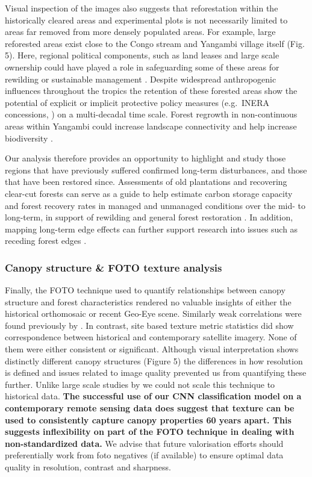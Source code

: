 \documentclass[remote sensing,article,submit,moreauthors,pdftex]{mdpi}
\begin{document}
Visual inspection of the images also suggests that reforestation within
the historically cleared areas and experimental plots is not necessarily
limited to areas far removed from more densely populated areas. For
example, large reforested areas exist close to the Congo stream and
Yangambi village itself (Fig. 5). Here, regional political components,
such as land leases and large scale ownership could have played a role
in safeguarding some of these areas for rewilding or sustainable
management \citep{arima2014, larson2011}. Despite widespread
anthropogenic influences throughout the tropics \citep{lewis2015} the
retention of these forested areas show the potential of explicit or
implicit protective policy measures (e.g.~INERA concessions,
\citet{bustillo2018}) on a multi-decadal time scale. Forest regrowth in
non-continuous areas within Yangambi could increase landscape
connectivity and help increase biodiversity \citep{vandeperre2018}.

Our analysis therefore provides an opportunity to highlight and study
those regions that have previously suffered confirmed long-term
disturbances, and those that have been restored since. Assessments of
old plantations and recovering clear-cut forests can serve as a guide to
help estimate carbon storage capacity and forest recovery rates in
managed and unmanaged conditions
\citep{gourlet-fleury2013, sader1988, achard2014} over the mid- to
long-term, in support of rewilding and general forest restoration
\citep{arima2014, larson2011, vandeperre2018}. In addition, mapping
long-term edge effects can further support research into issues such as
receding forest edges \citep{gascon2000}.

\hypertarget{canopy-structure-foto-texture-analysis-2}{%
\subsubsection{Canopy structure \& FOTO texture
analysis}\label{canopy-structure-foto-texture-analysis-2}}

Finally, the FOTO technique used to quantify relationships between
canopy structure and forest characteristics rendered no valuable
insights of either the historical orthomosaic or recent Geo-Eye scene.
Similarly weak correlations were found previously by
\citet{solorzano2018}. In contrast, site based texture metric statistics
did show correspondence between historical and contemporary satellite
imagery. None of them were either consistent or significant. Although
visual interpretation shows distinctly different canopy structures
(Figure 5) the differences in how resolution is defined and issues
related to image quality prevented us from quantifying these further.
Unlike large scale studies by \citet{Ploton2012} we could not scale this
technique to historical data. \textbf{The successful use of our CNN
classification model on a contemporary remote sensing data does suggest
that texture can be used to consistently capture canopy properties 60
years apart. This suggests inflexibility on part of the FOTO technique
in dealing with non-standardized data.} We advise that future
valorisation efforts should preferentially work from foto negatives (if
available) to ensure optimal data quality in resolution, contrast and
sharpness.
\end{document}
